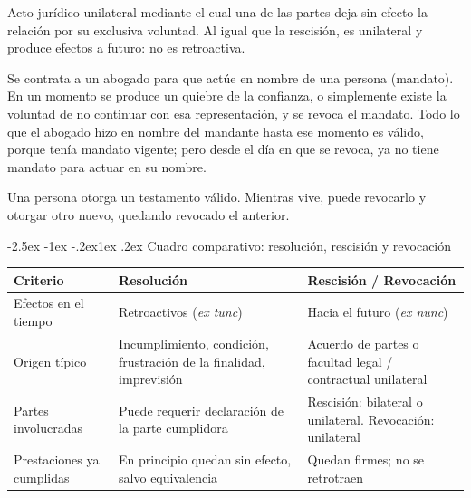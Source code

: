 \documentclass[12pt,oneside]{book}
\makeatletter
\renewcommand\subsection{\@startsection{subsection}{2}{\z@}%
  {-2.5ex \@plus -1ex \@minus -.2ex}{1ex \@plus .2ex}%
  {\normalfont\normalsize\bfseries}}
\makeatother
\begin{document}
\begin{definicion}[{Revocación}]
Acto jurídico unilateral mediante el cual una de las partes deja sin efecto la relación por su exclusiva voluntad. Al igual que la rescisión, es unilateral y produce efectos a futuro: no es retroactiva.
\end{definicion}

\begin{ejemplo}
Se contrata a un abogado para que actúe en nombre de una persona (mandato). En un momento se produce un quiebre de la confianza, o simplemente existe la voluntad de no continuar con esa representación, y se revoca el mandato. Todo lo que el abogado hizo en nombre del mandante hasta ese momento es válido, porque tenía mandato vigente; pero desde el día en que se revoca, ya no tiene mandato para actuar en su nombre.
\end{ejemplo}

\begin{ejemplo}
Una persona otorga un testamento válido. Mientras vive, puede revocarlo y otorgar otro nuevo, quedando revocado el anterior.
\end{ejemplo}

\subsection{Cuadro comparativo: resolución, rescisión y revocación}

\begin{table}[H]
\centering
\begin{tabularx}{\textwidth}{
    >{\raggedright\arraybackslash}p{3.0cm}
    >{\raggedright\arraybackslash}X
    >{\raggedright\arraybackslash}X
}
\toprule
\textbf{Criterio} & \textbf{Resolución} & \textbf{Rescisión / Revocación} \\
\midrule
Efectos en el tiempo & Retroactivos (\textit{ex tunc}) & Hacia el futuro (\textit{ex nunc}) \\
\addlinespace
Origen típico & Incumplimiento, condición, frustración de la finalidad, imprevisión & Acuerdo de partes o facultad legal / contractual unilateral \\
\addlinespace
Partes involucradas & Puede requerir declaración de la parte cumplidora & Rescisión: bilateral o unilateral. Revocación: unilateral \\
\addlinespace
Prestaciones ya cumplidas & En principio quedan sin efecto, salvo equivalencia & Quedan firmes; no se retrotraen \\
\bottomrule
\end{tabularx}
\end{table}
\end{document}
